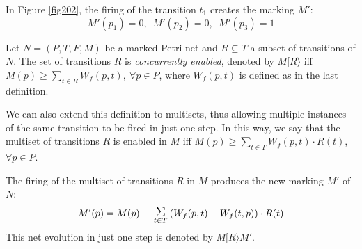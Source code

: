 \begin{example} In Figure \ref{fig202}, the firing of the transition $t_1$
creates the marking $M'$:
\[ M'(p_1) = 0,\,\,\,M'(p_2)=0,\,\,\,M'(p_3)=1 \]
\end{example}

\begin{definition} 
Let $N= (P,T,F,M)$ be a marked Petri net and $R \subseteq T$ a subset of transitions of $N$.
The set of transitions $R$ is \emph{concurrently enabled}, denoted by $M [ R \rangle$
iff $M(p) \geq \sum_{t \in R} W_f(p,t),~
\forall p\in P$, where
$W_f(p,t)$ is defined as in the last definition.

We can also extend this definition to multisets, thus allowing
multiple instances of the same transition to be fired in just one step.
In this way, we say that the multiset of transitions $R$ 
is enabled in $M$ iff $M(p)
\geq \sum_{t \in T} W_f(p,t) \cdot R(t)$, $\forall p \in P$.

The firing of the multiset of transitions $R$ in $M$ 
produces the new marking $M'$ of $N$:
\[ M'(p) = M(p) - \sumas{t \in T} (W_f(p,t) - W_f(t,p)) \cdot R(t)\]
This net evolution in just one step is denoted by
$M[ R \rangle M'$.
\end{definition}
